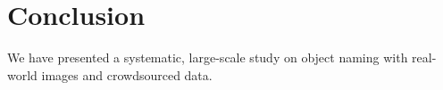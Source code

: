 
\section{Conclusion}

We have presented a systematic, large-scale study on object naming with real-world images and crowdsourced data.


